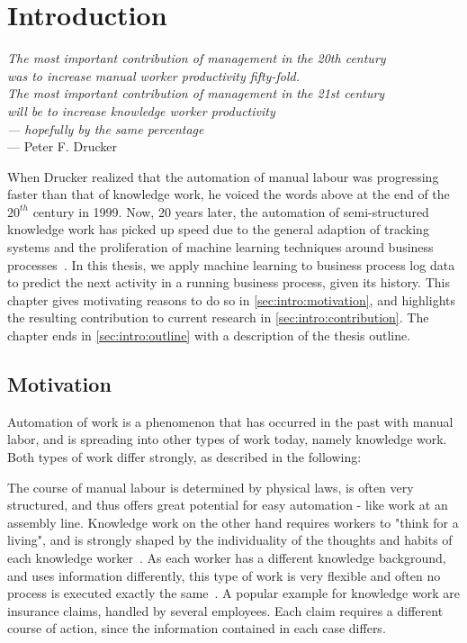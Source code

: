 \chapter{Introduction}\label{sec:intro}
\begin{flushright}{\slshape    
The most important contribution of management in the 20th century\\
was to increase manual worker productivity fifty-fold.\\
The most important contribution of management in the 21st century\\
will be to increase knowledge worker productivity\\
— hopefully by the same percentage} \\ \medskip
--- Peter F. Drucker~\cite{drucker1999}
\end{flushright}

\noindent When Drucker realized that the automation of manual labour was progressing faster than that of knowledge work, he voiced the words above at the end of the $20^{th}$ century in 1999. Now, 20 years later, the automation of semi-structured knowledge work has picked up speed due to the general adaption of tracking systems and the proliferation of machine learning techniques around business processes~\cite{boehmer2018probability, klinkmuller2018reliablemonitoring}.
In this thesis, we apply machine learning to business process log data to predict the next activity in a running business process, given its history. This chapter gives motivating reasons to do so in \autoref{sec:intro:motivation}, and highlights the resulting contribution to current research in \autoref{sec:intro:contribution}. The chapter ends in \autoref{sec:intro:outline} with a description of the thesis outline.

\section{Motivation} \label{sec:intro:motivation}
Automation of work is a phenomenon that has occurred in the past with manual labor, and is spreading into other types of work today, namely knowledge work. Both types of work differ strongly, as described in the following:

The course of manual labour is determined by physical laws, is often very structured, and thus offers great potential for easy automation - like work at an assembly line. Knowledge work on the other hand requires workers to "think for a living", and is strongly shaped by the individuality of the thoughts and habits of each knowledge worker~\cite{drucker1999}. As each worker has a different knowledge background, and uses information differently, this type of work is very flexible and often no process is executed exactly the same~\cite{hewelt2016}. A popular example for knowledge work are insurance claims, handled by several employees. Each claim requires a different course of action, since the information contained in each case differs.\\

